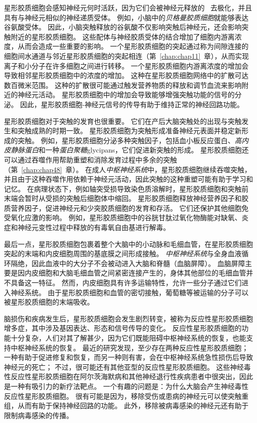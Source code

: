 星形胶质细胞会感知神经元何时活跃，因为它们会被神经元释放的~ 去极化，并且具有与神经元相似的神经递质受体。
例如，小脑中的\textit{贝格曼胶质细胞}就能够表达谷氨酸受体。
因此，小脑突触释放的谷氨酸不仅影响突触后神经元，还会影响突触附近的星形胶质细胞。
这些配体与神经胶质受体的结合增加了细胞内游离浓度，从而会造成一些重要的影响。
一个星形胶质细胞的突起通过称为间隙连接的细胞间水通道与邻近星形胶质细胞的突起相连（第~\ref{chap:chap11}~章），从而实现离子和小分子在许多细胞之间进行转移。
一个星形胶质细胞内游离浓度的增加会导致相邻星形胶质细胞中的浓度的增加。
这种在星形胶质细胞网络中的扩散可达数百微米范围。
这种的扩散很可能通过触发营养物质的释放和调节血流来影响附近的神经元活动。
星形胶质细胞中的增加会导致能够增强突触功能的信号的分泌。
因此，星形胶质细胞-神经元信号的传导有助于维持正常的神经回路功能。


星形胶质细胞对于突触的发育也很重要。
它们在产后大脑突触处的出现与突触发生和突触成熟的时期一致。
星形胶质细胞为突触形成准备神经元表面并稳定新形成的突触。
例如，星形胶质细胞分泌多种突触因子，包括血小板反应蛋白、\textit{高内皮静脉蛋白}和一种\textit{蛋白聚糖}glycipans，它们促进新突触的形成。
星形胶质细胞还可以通过吞噬作用帮助重塑和消除发育过程中多余的突触（第~\ref{chap:chap48}~章）。
在成人\textit{中枢神经系统}中，星形胶质细胞继续吞噬突触，并且由于这种吞噬作用依赖于神经元活动，因此突触的这种重塑可能有助于学习和记忆。
在病理状态下，例如轴突受损导致染色质溶解时，星形胶质细胞和突触前末端会暂时从受损的突触后细胞体中缩回。
星形胶质细胞释放神经营养因子和胶质营养因子，促进神经元和少突胶质细胞的发育和存活。
它们还保护其他细胞免受氧化应激的影响。
例如，星形胶质细胞中的谷胱甘肽过氧化物酶能对缺氧、炎症和神经元变性过程中释放的有毒氧自由基进行解毒。


最后一点，星形胶质细胞包裹着整个大脑中的小动脉和毛细血管，在星形胶质细胞突起的末端和内皮细胞周围的基底膜之间形成接触。
\textit{中枢神经系统}与全身血液循环隔绝，因此血液中的大分子不会被动进入大脑和脊髓（血脑屏障）。
血脑屏障主要是因内皮细胞和大脑毛细血管之间紧密连接产生的，身体其他部位的毛细血管并不具备这一特征。
然而，内皮细胞具有许多运输特性，允许一些分子通过它们进入神经系统。
由于星形胶质细胞和血管的密切接触，葡萄糖等被运输的分子可以被星形胶质细胞的末端吸收。


脑损伤和疾病发生后，星形胶质细胞会发生剧烈转变，被称为反应性星形胶质细胞增多症，其中涉及基因表达、形态和信号传导的变化。
反应性星形胶质细胞的功能十分复杂，人们对其了解甚少，因为它们既能阻碍中枢神经系统的恢复，也能支持中枢神经系统的恢复。
最近的研究发现，至少存在两种反应性星形胶质细胞；
一种有助于促进修复和恢复，而另一种则有害，会在中枢神经系统急性损伤后导致神经元的死亡；
不过，很可能还有其他亚型的反应性星形胶质细胞。
这些神经毒性反应性星形胶质细胞在阿尔茨海默病和其他神经退行性疾病患者中很突出，因此是一种有吸引力的新疗法靶点。
一个有趣的问题是：为什么大脑会产生神经毒性反应性星形胶质细胞。
很有可能是因为，移除受伤或患病的神经元可以使突触重组，从而有助于保持神经回路的功能。
此外，移除被病毒感染的神经元还有助于限制病毒感染的传播。


